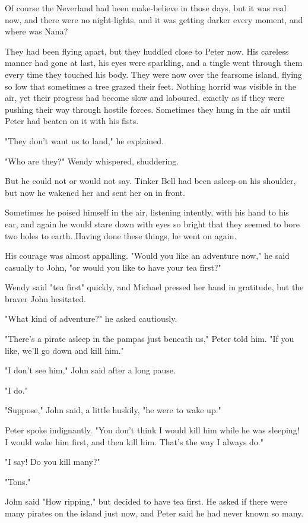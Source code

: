 Of course the Neverland had been make-believe in those days, but it was
real now, and there were no night-lights, and it was getting darker every
moment, and where was Nana?


They had been flying apart, but they huddled close to Peter now. His
careless manner had gone at last, his eyes were sparkling, and a tingle
went through them every time they touched his body. They were now over the
fearsome island, flying so low that sometimes a tree grazed their feet.
Nothing horrid was visible in the air, yet their progress had become slow
and laboured, exactly as if they were pushing their way through hostile
forces. Sometimes they hung in the air until Peter had beaten on it with
his fists.


"They don't want us to land," he explained.


"Who are they?" Wendy whispered, shuddering.


But he could not or would not say. Tinker Bell had been asleep on his
shoulder, but now he wakened her and sent her on in front.


Sometimes he poised himself in the air, listening intently, with his hand
to his ear, and again he would stare down with eyes so bright that they
seemed to bore two holes to earth. Having done these things, he went on
again.


His courage was almost appalling. "Would you like an adventure now," he
said casually to John, "or would you like to have your tea first?"


Wendy said "tea first" quickly, and Michael pressed her hand in gratitude,
but the braver John hesitated.


"What kind of adventure?" he asked cautiously.


"There's a pirate asleep in the pampas just beneath us," Peter told him.
"If you like, we'll go down and kill him."


"I don't see him," John said after a long pause.


"I do."


"Suppose," John said, a little huskily, "he were to wake up."


Peter spoke indignantly. "You don't think I would kill him while he was
sleeping! I would wake him first, and then kill him. That's the way I
always do."


"I say! Do you kill many?"


"Tons."


John said "How ripping," but decided to have tea first. He asked if there
were many pirates on the island just now, and Peter said he had never
known so many.


